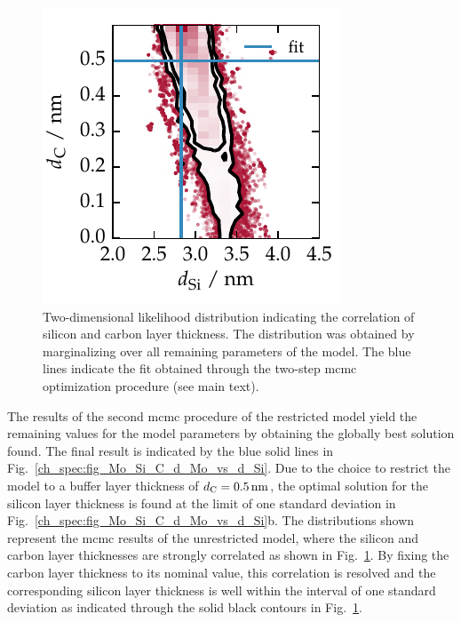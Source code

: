 \begin{figure}[htbp]
\centering
\includegraphics{img/Mo_Si_C_correlation_Si_C}
\caption[Correlation of silicon and carbon layer thickness parameters in the Mo/Si/C model.]{Two-dimensional likelihood distribution indicating the correlation of silicon and carbon layer thickness. The distribution was obtained by marginalizing over all remaining parameters of the model. The blue lines indicate the fit obtained through the two-step \gls{mcmc} optimization procedure (see main text).}
\label{ch_spec:fig_Mo_Si_C_correlation_Si_C}
\end{figure}
The results of the second \gls{mcmc} procedure of the restricted model yield the remaining values for the model parameters by obtaining the globally best solution found. The final result is indicated by the blue solid lines in Fig.~\ref{ch_spec:fig_Mo_Si_C_d_Mo_vs_d_Si}. Due to the choice to restrict the model to a buffer layer thickness of $d_\text{C} = \nm{0.5}$, the optimal solution for the silicon layer thickness is found at the limit of one standard deviation in Fig.~\ref{ch_spec:fig_Mo_Si_C_d_Mo_vs_d_Si}b. The distributions shown represent the \gls{mcmc} results of the unrestricted model, where the silicon and carbon layer thicknesses are strongly correlated as shown in Fig.~\ref{ch_spec:fig_Mo_Si_C_correlation_Si_C}. By fixing the carbon layer thickness to its nominal value, this correlation is resolved and the corresponding silicon layer thickness is well within the interval of one standard deviation as indicated through the solid black contours in Fig.~\ref{ch_spec:fig_Mo_Si_C_correlation_Si_C}.

